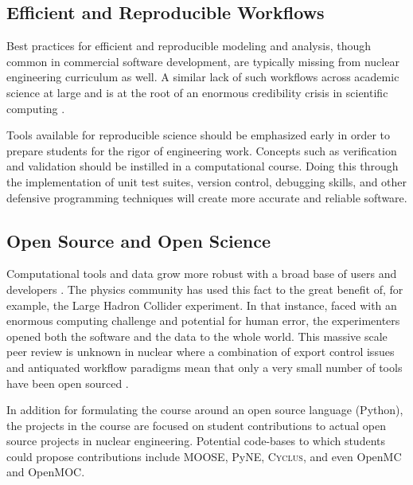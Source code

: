\documentclass{anstrans}
\begin{document}
\subsection{Efficient and Reproducible Workflows}

Best practices for efficient and reproducible modeling and analysis, though
common in commercial software development, are typically missing from nuclear
engineering curriculum as well. A similar lack of such workflows across
academic science at large and is  at the root of an enormous credibility
crisis in scientific computing \cite{donoho_reproducible_2009,
stodden_scientific_2010}.

Tools available for reproducible science should be emphasized early in order to
prepare students for the rigor of engineering work. Concepts such as
verification and validation should be instilled in a computational course.
Doing this through the implementation of unit test suites, version control,
debugging skills, and other defensive programming techniques will create
more accurate and reliable software.

\subsection{Open Source and Open Science}

Computational tools and data grow more robust with a broad base of users and
developers \cite{petre_code_2014, wicherts_willingness_2011}. The physics
community has used this fact to the great benefit of, for example, the Large
Hadron Collider experiment. In that instance, faced with an enormous computing
challenge and potential for human error, the experimenters opened both the
software and the data to the whole world. This massive scale peer review is
unknown in nuclear where a combination of export control issues and antiquated
workflow paradigms mean that only a very small number of tools have been open
sourced \cite{gaston_moose:_2009}\cite{scopatz_pyne:_2012}\cite{carlsen_cyclus_2014}.

In addition for formulating the course around an open source language (Python),
the projects in the course are focused on student contributions to actual open source
projects in nuclear engineering. Potential code-bases to which students could
propose contributions include MOOSE\cite{gaston_moose:_2009},
PyNE\cite{scopatz_pyne:_2012}, \textsc{Cyclus}\cite{carlsen_cyclus_2014}, and
even OpenMC\cite{romano_openmc_2013} and OpenMOC\cite{boyd_openmoc_2014}.
\end{document}
